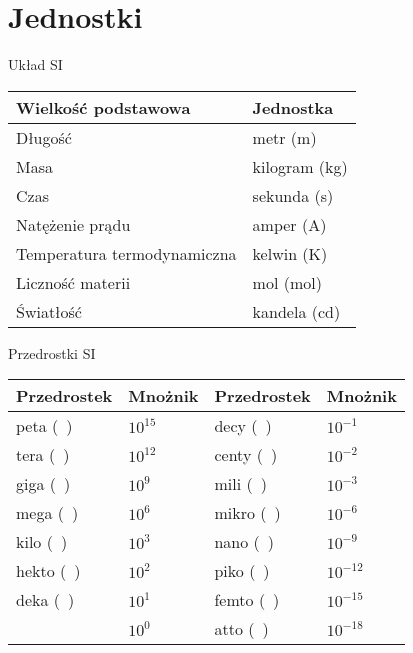 \documentclass[xcolor]{beamer}
\begin{document}
\section{Jednostki}
\begin{frame}{Układ SI}
	\begin{table}[H]
		\centering
		\begin{tabularx}{\textwidth}{XX}
			\toprule
			Wielkość podstawowa & Jednostka \\
			\midrule
			Długość & metr (\unit{\m}) \\
			Masa & kilogram (\unit{\kg}) \\
			Czas & sekunda (\unit{\s}) \\
			Natężenie prądu & amper (\unit{\A}) \\
			Temperatura termodynamiczna & kelwin (\unit{\K}) \\
			Liczność materii & mol (\unit{\mol}) \\
			Światłość & kandela (\unit{\candela}) \\
			\bottomrule
		\end{tabularx}
	\end{table}
\end{frame}

\begin{frame}{Przedrostki SI}
		\begin{table}[H]
		\centering
		\begin{tabularx}{\textwidth}{XXXX}
			\toprule
			Przedrostek & Mnożnik & Przedrostek & Mnożnik \\
			\midrule
			peta (\unit{\peta\nothing}) & $10^{15}$ & decy (\unit{\deci\nothing}) & $10^{-1}$ \\
			tera (\unit{\tera\nothing}) & $10^{12}$ & centy (\unit{\centi\nothing}) & $10^{-2}$ \\
			giga (\unit{\giga\nothing}) & $10^{9}$ & mili (\unit{\milli\nothing}) & $10^{-3}$ \\
			mega (\unit{\mega\nothing}) & $10^{6}$ & mikro (\unit{\micro\nothing}) & $10^{-6}$ \\
			kilo (\unit{\kilo\nothing}) & $10^{3}$ & nano (\unit{\nano\nothing}) & $10^{-9}$ \\
			hekto (\unit{\hecto\nothing}) & $10^{2}$ & piko (\unit{\pico\nothing}) & $10^{-12}$ \\
			deka (\unit{\deca\nothing}) & $10^{1}$ & femto (\unit{\femto\nothing}) & $10^{-15}$ \\
			& $10^{0}$ & atto (\unit{\atto\nothing}) & $10^{-18}$ \\
			\bottomrule
		\end{tabularx}
	\end{table}
\end{frame}
\end{document}
